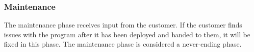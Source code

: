 \subsubsection{Maintenance}

The maintenance phase receives input from the customer\cite{waterfallexplained}. If the 
customer finds issues with the program after it has been deployed and handed to them, it 
will be fixed in this phase\cite{waterfallexplained}. The maintenance phase is considered a 
never-ending phase\cite{waterfallexplained}.